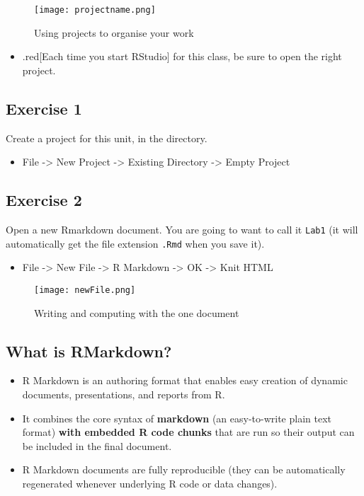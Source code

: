 \documentclass[]{article}
\providecommand{\tightlist}{%
  \setlength{\itemsep}{0pt}\setlength{\parskip}{0pt}}
\begin{document}
\begin{figure}
\centering
\texttt{[image: projectname.png]}
\caption{Using projects to organise your work}
\end{figure}

\begin{itemize}
\tightlist
\item
  .red{[}Each time you start RStudio{]} for this class, be sure to open
  the right project.
\end{itemize}

\hypertarget{exercise-1}{%
\subsection{Exercise 1}\label{exercise-1}}

Create a project for this unit, in the directory.

\begin{itemize}
\tightlist
\item
  File -\textgreater{} New Project -\textgreater{} Existing Directory
  -\textgreater{} Empty Project
\end{itemize}

\hypertarget{exercise-2}{%
\subsection{Exercise 2}\label{exercise-2}}

Open a new Rmarkdown document. You are going to want to call it
\texttt{Lab1} (it will automatically get the file extension
\texttt{.Rmd} when you save it).

\begin{itemize}
\tightlist
\item
  File -\textgreater{} New File -\textgreater{} R Markdown
  -\textgreater{} OK -\textgreater{} Knit HTML
\end{itemize}

\begin{figure}
\centering
\texttt{[image: newFile.png]}
\caption{Writing and computing with the one document}
\end{figure}

\hypertarget{what-is-rmarkdown}{%
\subsection{What is RMarkdown?}\label{what-is-rmarkdown}}

\begin{itemize}
\tightlist
\item
  R Markdown is an authoring format that enables easy creation of
  dynamic documents, presentations, and reports from R.
\item
  It combines the core syntax of \textbf{markdown} (an easy-to-write
  plain text format) \textbf{with embedded R code chunks} that are run
  so their output can be included in the final document.
\item
  R Markdown documents are fully reproducible (they can be automatically
  regenerated whenever underlying R code or data changes).
\end{itemize}
\end{document}
